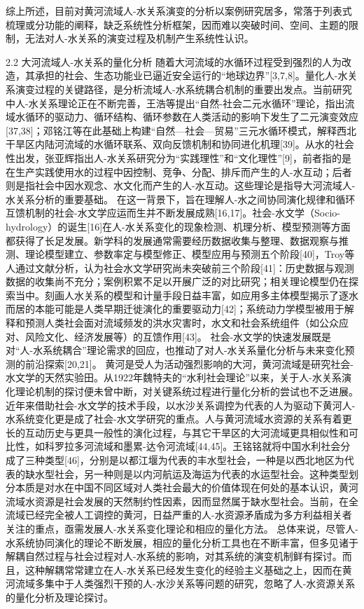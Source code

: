 综上所述，目前对黄河流域人-水关系演变的分析以案例研究居多，常落于列表式梳理或分功能的阐释，缺乏系统性分析框架，因而难以突破时间、空间、主题的限制，无法对人-水关系的演变过程及机制产生系统性认识。

2.2 大河流域人-水关系的量化分析
随着大河流域的水循环过程受到强烈的人为改造，其承担的社会、生态功能业已逼近安全运行的“地球边界”[3,7,8]。量化人-水关系演变过程的关键路径，是分析流域人-水系统耦合机制的重要出发点。当前研究中人-水关系理论正在不断完善，王浩等提出“自然-社会二元水循环”理论，指出流域水循环的驱动力、循环结构、循环参数在人类活动的影响下发生了二元演变效应[37,38]；邓铭江等在此基础上构建“自然—社会—贸易”三元水循环模式，解释西北干旱区内陆河流域的水循环联系、双向反馈机制和协同进化机理[39]。从水的社会性出发，张亚辉指出人-水关系研究分为“实践理性”和“文化理性”[9]，前者指的是在生产实践使用水的过程中因控制、竞争、分配、排斥而产生的人-水互动；后者则是指社会中因水观念、水文化而产生的人-水互动。这些理论是指导大河流域人-水关系分析的重要基础。
在这一背景下，旨在理解人-水之间协同演化规律和循环互馈机制的社会-水文学应运而生并不断发展成熟[16,17]。社会-水文学（Socio-hydrology）的诞生[16]在人-水关系变化的现象检测、机理分析、模型预测等方面都获得了长足发展。新学科的发展通常需要经历数据收集与整理、数据观察与推测、理论模型建立、参数率定与模型修正、模型应用与预测五个阶段[40]，Troy等人通过文献分析，认为社会水文学研究尚未突破前三个阶段[41]：历史数据与观测数据的收集尚不充分；案例积累不足以开展广泛的对比研究；相关理论模型仍在探索当中。刻画人水关系的模型和计量手段日益丰富，如应用多主体模型揭示了逐水而居的本能可能是人类早期迁徙演化的重要驱动力[42]；系统动力学模型被用于解释和预测人类社会面对流域频发的洪水灾害时，水文和社会系统组件（如公众应对、风险文化、经济发展等）的互馈作用[43]。 社会-水文学的快速发展既是对“人-水系统耦合”理论需求的回应，也推动了对人-水关系量化分析与未来变化预测的前沿探索[20,21]。
黄河是受人为活动强烈影响的大河，黄河流域是研究社会-水文学的天然实验田。从1922年魏特夫的“水利社会理论”以来，关于人-水关系演化理论机制的探讨便未曾中断，对关键系统过程进行量化分析的尝试也不乏进展。近年来借助社会-水文学的技术手段，以水沙关系调控为代表的人为驱动下黄河人-水系统变化更是成了社会-水文学研究的重点。人与黄河流域水资源的关系有着更长的互动历史与更具一般性的演化过程，与其它干旱区的大河流域更具相似性和可比性，如科罗拉多河流域和墨累-达令河流域[44,45]。王铭铭就将中国水利社会分成了三种类型[46]，分别是以都江堰为代表的丰水型社会，一种是以西北地区为代表的缺水型社会，另一种则是以内河航运及海运为代表的水运型社会。这种类型划分本质是对水在中国不同区域对人类社会最大的价值体现在何处的基本认识，黄河流域水资源是社会发展的天然制约性因素，因而显然属于缺水型社会。当前，在全流域已经完全被人工调控的黄河，日益严重的人-水资源矛盾成为多方利益相关者关注的重点，亟需发展人-水关系变化理论和相应的量化方法。
总体来说，尽管人-水系统协同演化的理论不断发展，相应的量化分析工具也在不断丰富，但多见诸于解耦自然过程与社会过程对人-水系统的影响，对其系统的演变机制鲜有探讨。而且，这种解耦常常建立在人-水关系已经发生变化的经验主义基础之上，因而在黄河流域多集中于人类强烈干预的人-水沙关系等问题的研究，忽略了人-水资源关系的量化分析及理论探讨。

